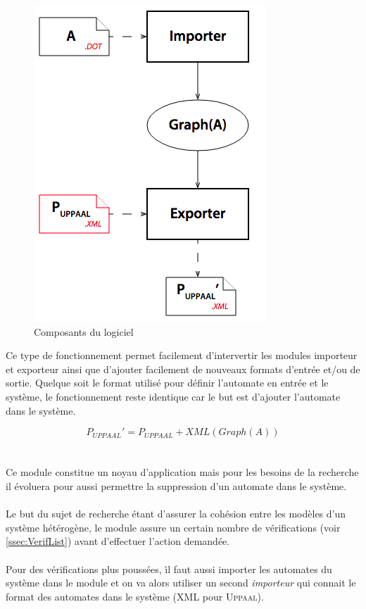 \documentclass[12pt,a4paper]{report}
\begin{document}
\begin{figure}[H]
  \centering
  \includegraphics[scale=0.6]{ressources/archi2.png}
  \caption{Composants du logiciel}
\end{figure}

Ce type de fonctionnement permet facilement d'intervertir les modules
importeur et exporteur ainsi que d'ajouter facilement de nouveaux formats d'entrée
et/ou de sortie.
Quelque soit le format utilisé pour définir l'automate en entrée et le système,
le fonctionnement reste identique car le but est d'ajouter l'automate dans le
système. 

\begin{equation}
P_{UPPAAL}' = P_{UPPAAL} + XML(Graph(A))
\end{equation}
\\\\
Ce module constitue un noyau d'application mais pour les besoins de la
recherche il évoluera pour aussi permettre la suppression d'un automate dans le système.
\\\\
Le but du sujet de recherche étant d'assurer la cohésion entre les modèles 
d'un système hétérogène, le module assure un certain nombre de vérifications (voir \ref{ssec:VerifList})
avant d'effectuer l'action demandée. 
\\\\
Pour des vérifications plus poussées, ìl
faut aussi importer les automates du système dans le module et 
on va alors utiliser un second \emph{importeur} qui connait le format des automates
dans le système (XML pour \textsc{Uppaal}).
\end{document}
